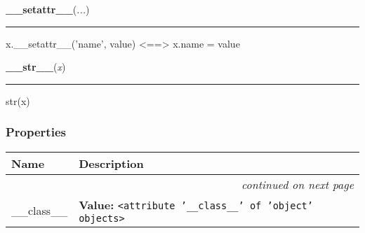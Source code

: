     \vspace{0.5ex}

    \begin{boxedminipage}{\textwidth}

    \raggedright \textbf{\_\_setattr\_\_}(\textit{...})

    \vspace{-1.5ex}

    \rule{\textwidth}{0.5\fboxrule}

x.{\_}{\_}setattr{\_}{\_}('name', value) {\textless}=={\textgreater} x.name = value
    \vspace{1ex}

    \end{boxedminipage}

    \label{object:__str__}

    \vspace{0.5ex}

    \begin{boxedminipage}{\textwidth}

    \raggedright \textbf{\_\_str\_\_}(\textit{x})

    \vspace{-1.5ex}

    \rule{\textwidth}{0.5\fboxrule}

str(x)
    \vspace{1ex}

    \end{boxedminipage}



  \subsubsection{Properties}

\begin{longtable}{|p{}|p{}|l}
\cline{1-2}
\cline{1-2} \centering \textbf{Name} & \centering \textbf{Description}& \\
\cline{1-2}
\endhead\cline{1-2}\multicolumn{3}{r}{\small\textit{continued on next page}}\\\endfoot\cline{1-2}
\endlastfoot\raggedright \_\-\_\-c\-l\-a\-s\-s\-\_\-\_\- & \raggedright \textbf{Value:} 
{\tt {\textless}attribute '\_\_class\_\_' of 'object' objects{\textgreater}}&\\
\cline{1-2}
\end{longtable}


